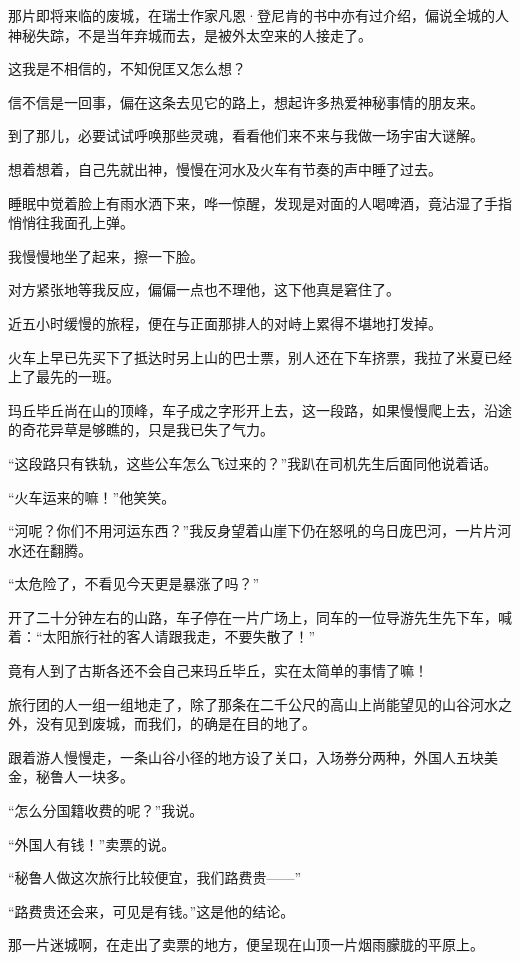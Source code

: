 \par 那片即将来临的废城，在瑞士作家凡恩·登尼肯的书中亦有过介绍，偏说全城的人神秘失踪，不是当年弃城而去，是被外太空来的人接走了。
\par 这我是不相信的，不知倪匡又怎么想？
\par 信不信是一回事，偏在这条去见它的路上，想起许多热爱神秘事情的朋友来。
\par 到了那儿，必要试试呼唤那些灵魂，看看他们来不来与我做一场宇宙大谜解。
\par 想着想着，自己先就出神，慢慢在河水及火车有节奏的声中睡了过去。
\par 睡眠中觉着脸上有雨水洒下来，哗一惊醒，发现是对面的人喝啤酒，竟沾湿了手指悄悄往我面孔上弹。
\par 我慢慢地坐了起来，擦一下脸。
\par 对方紧张地等我反应，偏偏一点也不理他，这下他真是窘住了。
\par 近五小时缓慢的旅程，便在与正面那排人的对峙上累得不堪地打发掉。
\par 火车上早已先买下了抵达时另上山的巴士票，别人还在下车挤票，我拉了米夏已经上了最先的一班。
\par 玛丘毕丘尚在山的顶峰，车子成之字形开上去，这一段路，如果慢慢爬上去，沿途的奇花异草是够瞧的，只是我已失了气力。
\par “这段路只有铁轨，这些公车怎么飞过来的？”我趴在司机先生后面同他说着话。
\par “火车运来的嘛！”他笑笑。
\par “河呢？你们不用河运东西？”我反身望着山崖下仍在怒吼的乌日庞巴河，一片片河水还在翻腾。
\par “太危险了，不看见今天更是暴涨了吗？”
\par 开了二十分钟左右的山路，车子停在一片广场上，同车的一位导游先生先下车，喊着：“太阳旅行社的客人请跟我走，不要失散了！”
\par 竟有人到了古斯各还不会自己来玛丘毕丘，实在太简单的事情了嘛！
\par 旅行团的人一组一组地走了，除了那条在二千公尺的高山上尚能望见的山谷河水之外，没有见到废城，而我们，的确是在目的地了。
\par 跟着游人慢慢走，一条山谷小径的地方设了关口，入场券分两种，外国人五块美金，秘鲁人一块多。
\par “怎么分国籍收费的呢？”我说。
\par “外国人有钱！”卖票的说。
\par “秘鲁人做这次旅行比较便宜，我们路费贵——”
\par “路费贵还会来，可见是有钱。”这是他的结论。
\par 那一片迷城啊，在走出了卖票的地方，便呈现在山顶一片烟雨朦胧的平原上。
